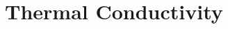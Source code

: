 \documentclass[aps,prb,twocolumn,superscriptaddress,footinbib,amsmath,amssymb,floatfix]{revtex4}
\begin{document}




\section{\label{S:Conductivity}Thermal Conductivity}
\end{document}
